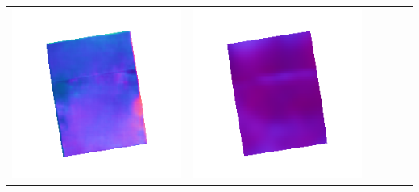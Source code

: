 \begin{center}
\begin{tabularx}{\linewidth}{@{}Y@{}Y@{}Y@{}Y@{}Y@{}Y@{}}
\includegraphics[width=\linewidth]{semisynthetic/20160617_0_marrnet_out.png} &
\includegraphics[width=\linewidth]{semisynthetic/20160617_0_ef_out.png} \\

\end{tabularx}
\end{center}
